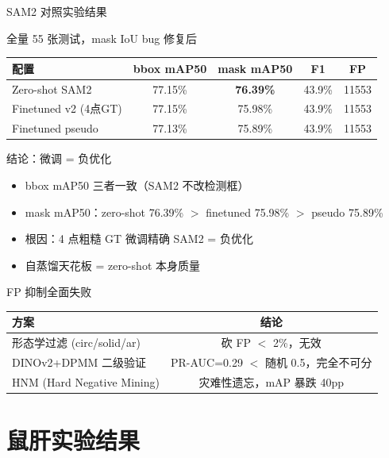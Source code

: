 \documentclass[aspectratio=169, 10pt]{beamer}
\begin{document}
\begin{frame}{SAM2 对照实验结果}
  \begin{block}{全量 55 张测试，mask IoU bug 修复后}
    \begin{tabular}{lcccc}
      \toprule
      \textbf{配置} & \textbf{bbox mAP50} & \textbf{mask mAP50} & \textbf{F1} & \textbf{FP} \\
      \midrule
      Zero-shot SAM2 & 77.15\% & \textbf{76.39\%} & 43.9\% & 11553 \\
      Finetuned v2 (4点GT) & 77.15\% & 75.98\% & 43.9\% & 11553 \\
      Finetuned pseudo & 77.13\% & 75.89\% & 43.9\% & 11553 \\
      \bottomrule
    \end{tabular}
  \end{block}
  \vspace{0em}
  \begin{alertblock}{结论：微调 = 负优化}
    \begin{itemize}
      \item bbox mAP50 三者一致（SAM2 不改检测框）
      \item mask mAP50：zero-shot 76.39\% $>$ finetuned 75.98\% $>$ pseudo 75.89\%
      \item 根因：4 点粗糙 GT 微调精确 SAM2 = 负优化
      \item 自蒸馏天花板 = zero-shot 本身质量
    \end{itemize}
  \end{alertblock}
  \vspace{0em}
  \begin{block}{FP 抑制全面失败}
    \begin{tabular}{lc}
      \toprule
      方案 & 结论 \\
      \midrule
      形态学过滤 (circ/solid/ar) & 砍 FP $<$ 2\%，无效 \\
      DINOv2+DPMM 二级验证 & PR-AUC=0.29 $<$ 随机 0.5，完全不可分 \\
      HNM (Hard Negative Mining) & 灾难性遗忘，mAP 暴跌 40pp \\
      \bottomrule
    \end{tabular}
  \end{block}
\end{frame}

\section{鼠肝实验结果}
\end{document}
